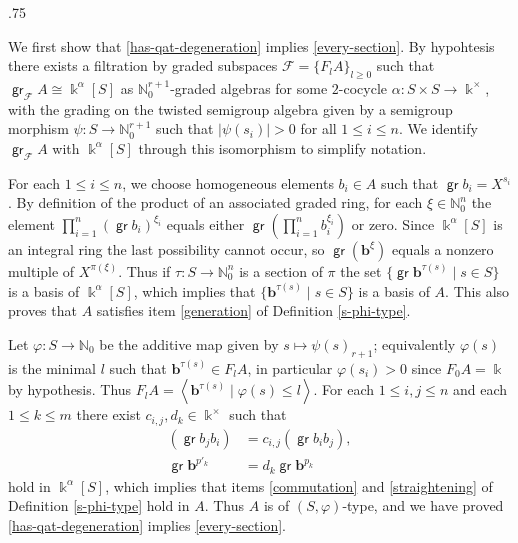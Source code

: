 \documentclass[11pt,fleqn]{article}
\makeatletter
\renewenvironment{proof}[1][\textit{Proof}]{\par
  \pushQED{\qed}%
  \normalfont \topsep.75\paraskip\relax
  \trivlist
  \item[\hskip\labelsep
        \itshape
    #1\@addpunct{.}]\ignorespaces
}{%
  \popQED\endtrivlist\@endpefalse
}
\newcommand\NN{\mathbb N}
\renewcommand\to{\longrightarrow}
\renewcommand\phi{\varphi}
\newcommand\vspan[1]{\left\langle #1 \right\rangle}
\newcommand\F{\mathcal F}
\renewcommand\b{\mathbf b}
\renewcommand\k{\Bbbk}
\DeclareMathOperator\gr{\mathsf{gr}}
\makeatother
\begin{document}
\begin{proof}
We first show that \ref{has-qat-degeneration} implies \ref{every-section}. By hypohtesis
there exists a filtration by graded subspaces $\F = \{F_lA\}_{l \geq 0}$ such that 
$\gr_\F A \cong \k^\alpha[S]$ as $\NN_0^{r+1}$-graded algebras for some $2$-cocycle 
$\alpha: S \times S \to \k^\times$, with the grading on the twisted semigroup algebra 
given by a semigroup morphism $\psi: S \to \NN_0^{r+1}$ such that $|\psi(s_i)| > 0$ for 
all $1 \leq i \leq n$. We identify $\gr_\F A$ with $\k^\alpha[S]$ through this 
isomorphism to simplify notation. 

For each $1 \leq i \leq n$, we choose homogeneous elements $b_i \in A$ such that 
$\gr b_i = X^{s_i}$. By definition of the product of an associated graded ring, for each 
$\xi \in \NN_0^n$ the element $\prod_{i = 1}^n (\gr b_i)^{\xi_i}$ equals either 
$\gr \left(\prod_{i = 1}^n b_i^{\xi_i}\right)$ or zero. Since $\k^\alpha[S]$ is an
integral ring the last possibility cannot occur, so $\gr (\b^\xi)$ equals a nonzero 
multiple of $X^{\pi(\xi)}$. Thus if $\tau: S \to \NN_0^n$ is a section of $\pi$ the set 
$\{\gr \b^{\tau(s)} \mid s \in S\}$ is a basis of $\k^\alpha[S]$, which implies that 
$\{\b^{\tau(s)} \mid s \in S\}$ is a basis of $A$. This also proves that $A$ satisfies 
item \ref{generation} of Definition \ref{s-phi-type}.

Let $\phi: S \to \NN_0$ be the additive map given by $s \mapsto \psi(s)_{r+1}$; equivalently $\phi(s)$ is the minimal $l$ such that $\b^{\tau(s)} \in F_lA$, in particular $\phi(s_i) > 0$ since $F_0A = \k$ by hypothesis. Thus $F_lA = \vspan{
\b^{\tau(s)} \mid \phi(s) \leq l}$. For each $1 \leq i,j \leq n$
and each $1 \leq k \leq m$ there exist $c_{i,j}, d_k \in \k^\times$ such that
\begin{align*}
  (\gr b_j b_i) &= c_{i,j} (\gr b_i b_j),\\
  \gr \b^{p'_k} &= d_k \gr \b^{p_k}
\end{align*}
hold in $\k^\alpha[S]$, which implies that items \ref{commutation} and 
\ref{straightening} of Definition \ref{s-phi-type} hold in $A$. Thus $A$ is of
$(S,\phi)$-type, and we have proved \ref{has-qat-degeneration} implies 
\ref{every-section}.


\end{proof}
\end{document}
